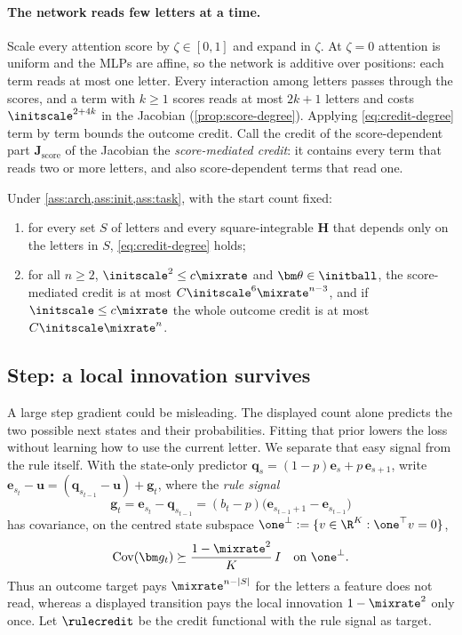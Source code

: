 \paragraph{The network reads few letters at a time.} Scale every attention score by $\zeta\in[0,1]$ and expand in $\zeta$. At $\zeta=0$ attention is uniform
and the MLPs are affine, so the network is additive over positions: each term reads at most one letter. Every interaction among letters
passes through the scores, and a term with $k\ge1$ scores reads at most $2k+1$ letters and costs $\initscale^{2+4k}$ in the Jacobian
(\cref{prop:score-degree}). Applying \cref{eq:credit-degree} term by term bounds the outcome credit. Call the credit of the score-dependent part
$\mathbf J_{\mathrm{score}}$ of the Jacobian the \emph{score-mediated credit}: it contains every term that reads two or more letters, and
also score-dependent terms that read one.

\begin{theorem}
\label{thm:main}
Under \cref{ass:arch,ass:init,ass:task}, with the start count fixed:
\begin{enumerate}[label=(\roman*),leftmargin=*,itemsep=0pt,topsep=2pt]
\item for every set $S$ of letters and every square-integrable $\mathbf H$ that depends only on the letters in $S$, \cref{eq:credit-degree} holds;
\item for all $n\ge2$, $\initscale^2\le c\mixrate$ and $\bm\theta\in\initball$, the score-mediated credit is at most $C\initscale^6\mixrate^{n-3}$, and if
$\initscale\le c\mixrate$ the whole outcome credit is at most $C\initscale\mixrate^n$.
\end{enumerate}
\end{theorem}

\subsection{Step: a local innovation survives}
A large step gradient could be misleading. The displayed count alone predicts the two possible next states and their probabilities.
Fitting that prior lowers the loss without learning how to use the current letter. We separate that easy signal from the rule itself. With the
state-only predictor $\bm q_s=(1-p)\bm e_s+p\,\bm e_{s+1}$, write $\bm e_{s_t}-\bm u=(\bm q_{s_{t-1}}-\bm u)+\bm g_t$, where the
\emph{rule signal}
\[
 \bm g_t=\bm e_{s_t}-\bm q_{s_{t-1}}=(b_t-p)\bigl(\bm e_{s_{t-1}+1}-\bm e_{s_{t-1}}\bigr)
\]
has covariance, on the centred state subspace $\one^\perp:=\{v\in\R^K:\one^\top v=0\}$,
\begin{equation}
 \operatorname{Cov}(\bm g_t)\succeq\frac{1-\mixrate^2}{K}\,I
 \quad\text{on }\one^\perp.
 \label{eq:local-variation}
\end{equation}
Thus an outcome target pays $\mixrate^{n-|S|}$ for the letters a feature does not read, whereas a displayed transition pays the
local innovation $1-\mixrate^2$ only once. Let $\rulecredit$ be the credit
functional with the rule signal as target.

